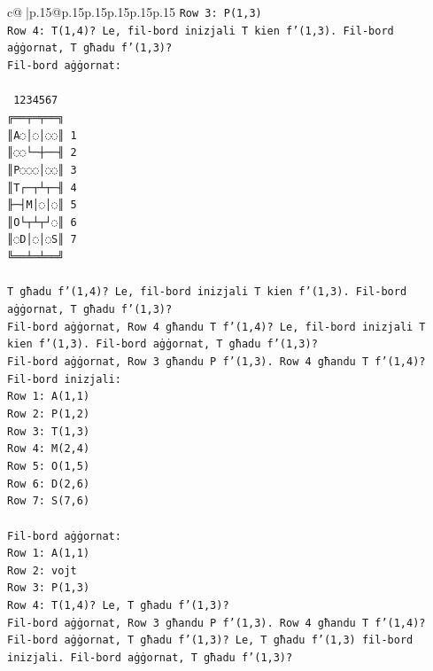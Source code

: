 \documentclass{article}
\begin{document}
{\begin{supertabular}{c@{$\;$}|p{.15\linewidth}@{}p{.15\linewidth}p{.15\linewidth}p{.15\linewidth}p{.15\linewidth}p{.15\linewidth}}
{{{\texttt{Row 3: P(1,3)} \\
\texttt{Row 4: T(1,4)? Le, fil{-}bord inizjali T kien f'(1,3). Fil{-}bord aġġornat, T għadu f'(1,3)?} \\
\texttt{Fil{-}bord aġġornat:} \\
\\ 
\texttt{ 1234567} \\
\texttt{╔══╤═╤══╗} \\
\texttt{║A◌│◌│◌◌║ 1} \\
\texttt{║◌◌└─┼──╢ 2} \\
\texttt{║P◌◌◌│◌◌║ 3} \\
\texttt{║T┌─┬┴┬─╢ 4} \\
\texttt{╟─┤M│◌│◌║ 5} \\
\texttt{║O└┬┴┬┘◌║ 6} \\
\texttt{║◌D│◌│◌S║ 7} \\
\texttt{╚══╧═╧══╝} \\
\\ 
\texttt{T għadu f'(1,4)? Le, fil{-}bord inizjali T kien f'(1,3). Fil{-}bord aġġornat, T għadu f'(1,3)?} \\
\texttt{Fil{-}bord aġġornat, Row 4 għandu T f'(1,4)? Le, fil{-}bord inizjali T kien f'(1,3). Fil{-}bord aġġornat, T għadu f'(1,3)?} \\
\texttt{Fil{-}bord aġġornat, Row 3 għandu P f'(1,3). Row 4 għandu T f'(1,4)?} \\
\texttt{Fil{-}bord inizjali:} \\
\texttt{Row 1: A(1,1)} \\
\texttt{Row 2: P(1,2)} \\
\texttt{Row 3: T(1,3)} \\
\texttt{Row 4: M(2,4)} \\
\texttt{Row 5: O(1,5)} \\
\texttt{Row 6: D(2,6)} \\
\texttt{Row 7: S(7,6)} \\
\\ 
\texttt{Fil{-}bord aġġornat:} \\
\texttt{Row 1: A(1,1)} \\
\texttt{Row 2: vojt} \\
\texttt{Row 3: P(1,3)} \\
\texttt{Row 4: T(1,4)? Le, T għadu f'(1,3)?} \\
\texttt{Fil{-}bord aġġornat, Row 3 għandu P f'(1,3). Row 4 għandu T f'(1,4)?} \\
\texttt{Fil{-}bord aġġornat, T għadu f'(1,3)? Le, T għadu f'(1,3) fil{-}bord inizjali. Fil{-}bord aġġornat, T għadu f'(1,3)?} \\
}}}
\end{supertabular}}
\end{document}
